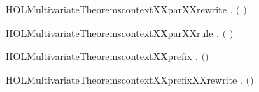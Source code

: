 \newcommand{\HOLMultivariateTheoremscontextXXpar}{\UseVerbatim{HOLMultivariateTheoremscontextXXpar}}
\begin{SaveVerbatim}{HOLMultivariateTheoremscontextXXparXXrewrite}
\HOLTokenTurnstile{} \HOLSymConst{\HOLTokenForall{}}  .
         \ensuremath{(} \HOLSymConst{\ensuremath{\mid}} \ensuremath{)} \HOLSymConst{\HOLTokenEquiv{}}    \HOLSymConst{\HOLTokenConj{}}   
\end{SaveVerbatim}
\newcommand{\HOLMultivariateTheoremscontextXXparXXrewrite}{\UseVerbatim{HOLMultivariateTheoremscontextXXparXXrewrite}}
\begin{SaveVerbatim}{HOLMultivariateTheoremscontextXXparXXrule}
\HOLTokenTurnstile{} \HOLSymConst{\HOLTokenForall{}}  .
          \HOLSymConst{\HOLTokenConj{}}    \HOLSymConst{\HOLTokenImp{}}   \ensuremath{(} \HOLSymConst{\ensuremath{\mid}} \ensuremath{)}
\end{SaveVerbatim}
\newcommand{\HOLMultivariateTheoremscontextXXparXXrule}{\UseVerbatim{HOLMultivariateTheoremscontextXXparXXrule}}
\begin{SaveVerbatim}{HOLMultivariateTheoremscontextXXprefix}
\HOLTokenTurnstile{} \HOLSymConst{\HOLTokenForall{}}  .   \ensuremath{(}\HOLSymConst{\ensuremath{\ldotp}}\ensuremath{)} \HOLSymConst{\HOLTokenImp{}}   
\end{SaveVerbatim}
\newcommand{\HOLMultivariateTheoremscontextXXprefix}{\UseVerbatim{HOLMultivariateTheoremscontextXXprefix}}
\begin{SaveVerbatim}{HOLMultivariateTheoremscontextXXprefixXXrewrite}
\HOLTokenTurnstile{} \HOLSymConst{\HOLTokenForall{}}  .   \ensuremath{(}\HOLSymConst{\ensuremath{\ldotp}}\ensuremath{)} \HOLSymConst{\HOLTokenEquiv{}}   
\end{SaveVerbatim}
